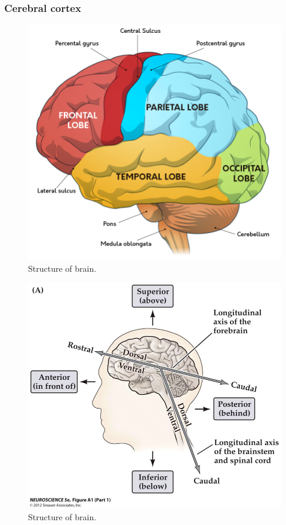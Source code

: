 \documentclass{article}
\begin{document}
	\subsubsection{Cerebral cortex}
	\begin{figure}
		\includegraphics[width=\linewidth]{pic/brain_structure.png}
		\caption{Structure of brain.}
	\end{figure}
	\begin{figure}
		\includegraphics[width=\linewidth]{pic/brain_pos.png}
		\caption{Structure of brain.}
	\end{figure}
\end{document}
